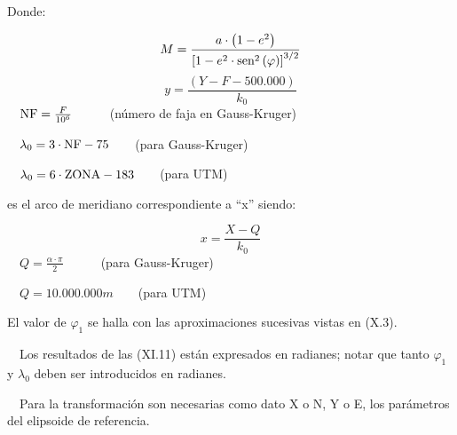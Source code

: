 \documentclass{tufte-book}
\newcommand\normalsubformula[1]{\text{\mathversion{normal}$#1$}}
\begin{document}
Donde:

\begin{equation*}
{M=\frac{a\cdot \left(1-e^{{2}}\right)}{\left[1-e^{{2}}\cdot
\normalsubformula{\text{sen}}^{{2}}\left(\varphi
\right)\right]^{{3/2}}}}
\end{equation*}
\begin{equation*}
{y=\frac{\left(Y-F-\text{500}\text{.}\text{000}\right)}{k_{{0}}}}
\end{equation*}
\ \ 
${\normalsubformula{\text{NF}}=\frac{F}{\text{10}^{{6}}}}$\ \ \ \ \ \ (número
de faja en Gauss-Kruger)

\ \  ${\lambda _{{0}}=3\cdot
\normalsubformula{\text{NF}}-\text{75}}$\ \ \ \ (para Gauss-Kruger)

\ \  ${\lambda _{{0}}=6\cdot
\normalsubformula{\text{ZONA}}-\text{183}}$\ \ \ \ (para UTM)

es el arco de meridiano correspondiente a
{\textquotedblleft}x{\textquotedblright} siendo:

\begin{equation*}
{x=\frac{X-Q}{k_{{0}}}}
\end{equation*}
\ \  ${Q=\frac{\alpha \cdot \pi }{2}}$\ \ \ \ \ \ (para Gauss-Kruger)

\ \  ${Q=\text{10}\text{.}\text{000}\text{.}\text{000}m}$\ \ \ \ (para
UTM)

El valor de  ${\varphi _{{1}}}$ se halla con las aproximaciones
sucesivas vistas en (X.3).

\ \ Los resultados de las (XI.11) están expresados en radianes; notar
que tanto  ${\varphi _{{1}}}$ y  ${\lambda _{{0}}}$ deben ser
introducidos en radianes.

\ \ Para la transformación son necesarias como dato X o N, Y o E, los
parámetros del elipsoide de referencia.
\end{document}
